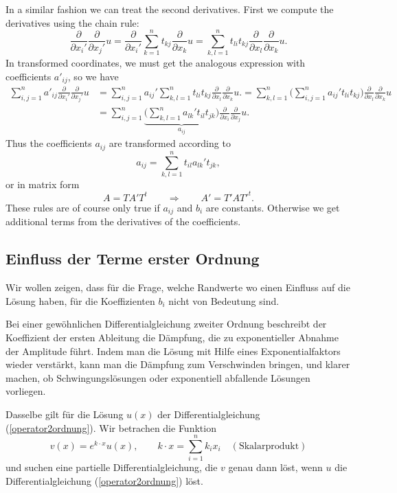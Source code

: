 In a similar fashion we can treat the second derivatives.
First we compute the derivatives using the chain rule:
\[
\frac{\partial}{\partial x_i'}\frac{\partial}{\partial x_j'} u
=
\frac{\partial}{\partial x_i'}
\sum_{k=1}^nt_{kj}\frac{\partial}{\partial x_k}u
=
\sum_{k,l=1}^nt_{li}t_{kj}\frac{\partial}{\partial x_l}\frac{\partial}{\partial x_k}u.
\]
In transformed coordinates, we must get the analogous expression
with coefficients $a'_{ij}$, so we have
\begin{align*}
\sum_{i,j=1}^n
a'_{ij}\frac{\partial}{\partial x_i'}\frac{\partial}{\partial x_j'} u
&=
\sum_{i,j=1}^n
a_{ij}'
\sum_{k,l=1}^n
t_{li}t_{kj}\frac{\partial}{\partial x_l}\frac{\partial}{\partial x_k}u.
=
\sum_{k,l=1}^n
\biggl(
\sum_{i,j=1}^n
a_{ij}'
t_{li}t_{kj}
\biggr)
\frac{\partial}{\partial x_l}\frac{\partial}{\partial x_k}u
\\
&=
\sum_{i,j=1}^n
\underbrace{
\biggl(
\sum_{k,l=1}^n
a_{lk}'
t_{il}t_{jk}
\biggr)}_{\textstyle a_{ij}}
\frac{\partial}{\partial x_i}\frac{\partial}{\partial x_j}u.
\end{align*}
Thus the coefficients
$a_{ij}$ are transformed according to
\[
a_{ij}=\sum_{k,l=1}^n t_{il}a_{lk}'t_{jk},
\]
or in matrix form
\[
A=TA'T^t
\qquad\Rightarrow\qquad
A'=T'AT'^t.
\]
These rules are of course only true if 
$a_{ij}$ and $b_i$ are constants.
Otherwise we get additional terms from the derivatives of the coefficients.


\subsection{Einfluss der Terme erster Ordnung
\label{einfluss-terme-erster-ordnung}}
Wir wollen zeigen, dass für die Frage, welche Randwerte wo einen
Einfluss auf die Lösung haben, für die Koeffizienten $b_i$ nicht
von Bedeutung sind.

Bei einer gewöhnlichen Differentialgleichung zweiter Ordnung beschreibt
der Koeffizient der ersten Ableitung die Dämpfung, die zu exponentieller
Abnahme der Amplitude führt.
Indem man die Lösung mit Hilfe eines Exponentialfaktors wieder verstärkt,
kann man die Dämpfung zum Verschwinden bringen, und klarer machen,
ob Schwingungslösungen oder exponentiell abfallende Lösungen vorliegen.

Dasselbe gilt für die Lösung $u(x)$ der Differentialgleichung
(\ref{operator2ordnung}).
Wir betrachen die Funktion
\[
v(x)=e^{k\cdot x} u(x),
\qquad
k\cdot x = \sum_{i=1}^n k_ix_i \quad(\text{Skalarprodukt})
\]
und suchen eine partielle Differentialgleichung, die $v$ genau dann löst,
wenn $u$ die Differentialgleichung
(\ref{operator2ordnung}) löst.

